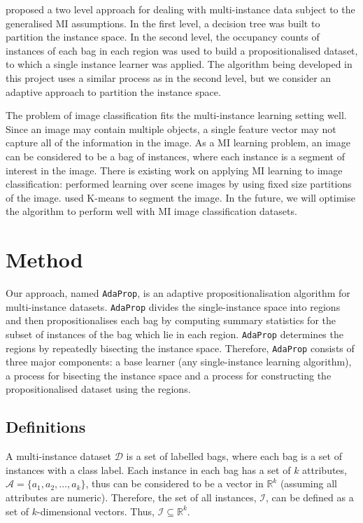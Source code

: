 \documentclass[a4paper,12pt]{article} %
\newcommand{\AdaProp}{\texttt{AdaProp}\xspace}
\newcommand{\real}{\mathbb{R}}
\newcommand{\mcl}[1]{\mathcal{#1}}
\begin{document}
 proposed a two level approach for dealing with multi-instance data 
    subject to the generalised MI assumptions. 
In the first level, 
    a decision tree was built to partition the instance space. 
In the second level, 
    the occupancy counts of instances of each bag in each region 
    was used to build a propositionalised dataset, 
    to which a single instance learner was applied.
The algorithm being developed in this project uses a similar process 
    as  in the second level, 
    but we consider an adaptive approach to partition the instance space.

The problem of image classification fits the multi-instance learning setting well. 
Since an image may contain multiple objects, 
    a single feature vector may not capture all 
    of the information in the image. 
As a MI learning problem, 
    an image can be considered to be a bag of instances, 
    where each instance is a segment of interest in the image. 
There is existing work on applying MI learning to image classification: 
     performed learning over scene images by 
        using fixed size partitions of the image. 
     used K-means to segment the image. 
In the future, 
    we will optimise the algorithm to perform well 
    with MI image classification datasets.

\section{Method}

Our approach, named \AdaProp, is an adaptive propositionalisation algorithm 
    for multi-instance datasets.
\AdaProp divides the single-instance space
    into regions and then propositionalises each bag 
    by computing summary statistics for the 
    subset of instances of the bag which lie in each region.
\AdaProp determines the regions by repeatedly bisecting the instance space.
Therefore, \AdaProp consists of three major components: 
    a base learner (any single-instance learning algorithm),
    a process for bisecting the instance space and 
    a process for constructing the propositionalised dataset using the regions.

\subsection{Definitions}
A multi-instance dataset $\mcl{D}$ is a set of labelled bags, 
    where each bag is a set of instances with a class label.
Each instance in each bag has a set of $k$ attributes,
    $\mcl{A} = \{ a_1,a_2,\ldots,a_k \}$, 
    thus can be considered to be a vector in $\real^k$
    (assuming all attributes are numeric).
Therefore, the set of all instances, $\mcl{I}$,
    can be defined as a set of $k$-dimensional vectors.
Thus, $ \mcl{I} \subseteq \real^k $.
\end{document}
